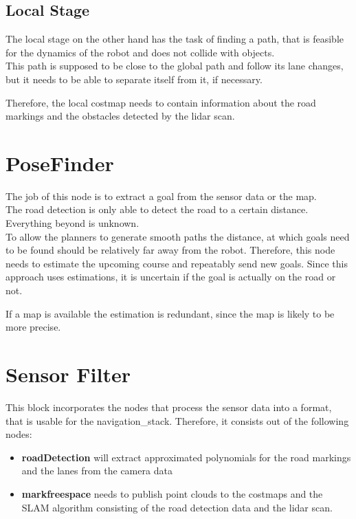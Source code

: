 \subsection{Local Stage}
The local stage on the other hand has the task of finding a path, that is feasible for the dynamics of the robot and does not collide with objects.\\
This path is supposed to be close to the global path and follow its lane changes, but it needs to be able to separate itself from it, if necessary.

Therefore, the local costmap needs to contain information about the road markings and the obstacles detected by the lidar scan.

\section{PoseFinder}
The job of this node is to extract a goal from the sensor data or the map.\\

The road detection is only able to detect the road to a certain distance. Everything beyond is unknown.\\
To allow the planners to generate smooth paths the distance, at which goals need to be found should be relatively far away from the robot. Therefore, this node needs to estimate the upcoming course and repeatably send new goals. Since this approach uses estimations, it is uncertain if the goal is actually on the road or not.

If a map is available the estimation is redundant, since the map is likely to be more precise.

\section{Sensor Filter}

This block incorporates the nodes that process the sensor data into a format, that is usable for the navigation\_stack. 
Therefore, it consists out of the following nodes:

\begin{itemize}
	\item \textbf{roadDetection} will extract approximated polynomials for the road markings and the lanes from the camera data
	\item \textbf{markfreespace} needs to publish point clouds to the costmaps and the SLAM algorithm consisting of the road detection data and the lidar scan.
\end{itemize}

